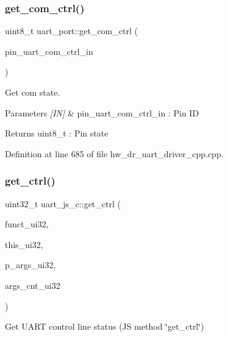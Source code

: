\mbox{\label{group___u_a_r_t_ga12e1b2d17a75391c8c90d3626e19e397}} 
\subsubsection{get\_com\_ctrl()}
{\footnotesize\ttfamily uint8\+\_\+t uart\+\_\+port\+::get\+\_\+com\+\_\+ctrl (\begin{DoxyParamCaption}\item[{\textbf{ uart\+\_\+com\+\_\+ctrl\+\_\+in\+\_\+t}}]{pin\+\_\+uart\+\_\+com\+\_\+ctrl\+\_\+in }\end{DoxyParamCaption})}



Get com state. 


\begin{DoxyParams}{Parameters}
{\em \mbox{[}\+I\+N\mbox{]}} & pin\+\_\+uart\+\_\+com\+\_\+ctrl\+\_\+in \+: Pin ID \\
\hline
\end{DoxyParams}
\begin{DoxyReturn}{Returns}
uint8\+\_\+t \+: Pin state 
\end{DoxyReturn}


Definition at line 685 of file hw\+\_\+dr\+\_\+uart\+\_\+driver\+\_\+cpp.\+cpp.

\mbox{\label{group___u_a_r_t_ga0074b9985040f4906c912cef12d16538}} 
\subsubsection{get\_ctrl()}
{\footnotesize\ttfamily uint32\+\_\+t uart\+\_\+js\+\_\+c\+::get\+\_\+ctrl (\begin{DoxyParamCaption}\item[{const uint32\+\_\+t}]{funct\+\_\+ui32,  }\item[{const uint32\+\_\+t}]{this\+\_\+ui32,  }\item[{const uint32\+\_\+t $\ast$}]{p\+\_\+args\+\_\+ui32,  }\item[{const uint32\+\_\+t}]{args\+\_\+cnt\+\_\+ui32 }\end{DoxyParamCaption})\hspace{0.3cm}{\ttfamily [static]}}



Get U\+A\+RT control line status (JS method \char`\"{}get\+\_\+ctrl\char`\"{}) 


